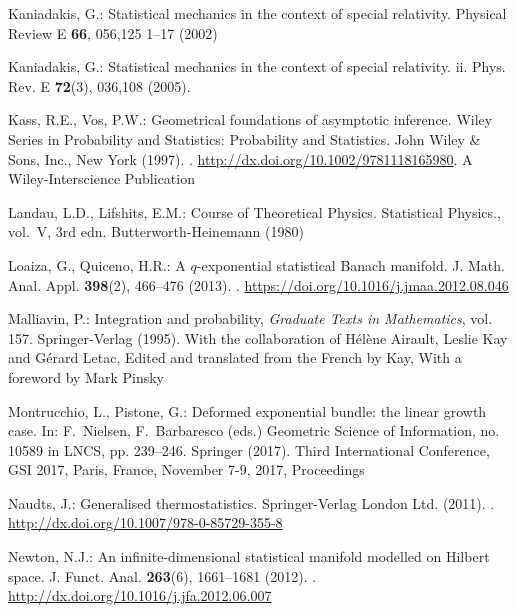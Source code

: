 \documentclass[graybox]{svmult}
\begin{document}
\begin{thebibliography}{10}
Kaniadakis, G.: Statistical mechanics in the context of special relativity.
\newblock Physical Review E \textbf{66}, 056,125 1--17 (2002)

Kaniadakis, G.: Statistical mechanics in the context of special relativity. ii.
\newblock Phys. Rev. E \textbf{72}(3), 036,108 (2005).
\newblock {}

Kass, R.E., Vos, P.W.: Geometrical foundations of asymptotic inference.
\newblock Wiley Series in Probability and Statistics: Probability and
  Statistics. John Wiley \& Sons, Inc., New York (1997).
\newblock {}.
\newblock \urlprefix\url{http://dx.doi.org/10.1002/9781118165980}.
\newblock A Wiley-Interscience Publication

Landau, L.D., Lifshits, E.M.: Course of Theoretical Physics. Statistical
  Physics., vol.~V, 3rd edn.
\newblock Butterworth-Heinemann (1980)

Loaiza, G., Quiceno, H.R.: A {$q$}-exponential statistical {B}anach manifold.
\newblock J. Math. Anal. Appl. \textbf{398}(2), 466--476 (2013).
\newblock {}.
\newblock \urlprefix\url{https://doi.org/10.1016/j.jmaa.2012.08.046}

Malliavin, P.: Integration and probability, \emph{Graduate Texts in
  Mathematics}, vol. 157.
\newblock Springer-Verlag (1995).
\newblock With the collaboration of Hélène Airault, Leslie Kay and Gérard
  Letac, Edited and translated from the French by Kay, With a foreword by Mark
  Pinsky

Montrucchio, L., Pistone, G.: Deformed exponential bundle: the linear growth
  case.
\newblock In: F.~Nielsen, F.~Barbaresco (eds.) {G}eometric {S}cience of
  {I}nformation, no. 10589 in LNCS, pp. 239--246. Springer (2017).
\newblock Third International Conference, GSI 2017, Paris, France, November
  7-9, 2017, Proceedings

Naudts, J.: Generalised thermostatistics.
\newblock Springer-Verlag London Ltd. (2011).
\newblock {}.
\newblock \urlprefix\url{http://dx.doi.org/10.1007/978-0-85729-355-8}

Newton, N.J.: An infinite-dimensional statistical manifold modelled on
  {H}ilbert space.
\newblock J. Funct. Anal. \textbf{263}(6), 1661--1681 (2012).
\newblock {}.
\newblock \urlprefix\url{http://dx.doi.org/10.1016/j.jfa.2012.06.007}


\end{thebibliography}
\end{document}
